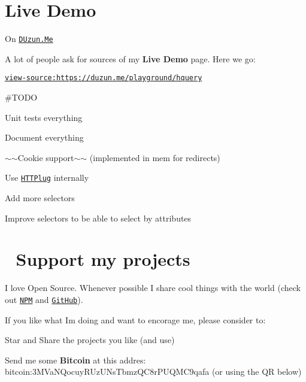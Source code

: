 \section*{Live Demo}

On \href{https://duzun.me/playground/hquery#sel=%20a%20%3E%20img%3Aparent&url=https%3A%2F%2Fgithub.com%2Fduzun}{\tt D\+Uzun.\+Me}

A lot of people ask for sources of my {\bfseries Live Demo} page. Here we go\+:

\href{https://github.com/duzun/hQuery.php/blob/master/examples/duzun.me_playground_hquery.php}{\tt view-\/source\+:https\+://duzun.\+me/playground/hquery}

\#\+T\+O\+DO


\begin{DoxyItemize}
\item Unit tests everything
\item Document everything
\item $\sim$$\sim$\+Cookie support$\sim$$\sim$ (implemented in mem for redirects)
\item Use \href{http://httplug.io/}{\tt H\+T\+T\+Plug} internally
\item Add more selectors
\item Improve selectors to be able to select by attributes
\end{DoxyItemize}

\section*{💖 Support my projects}

I love Open Source. Whenever possible I share cool things with the world (check out \href{https://duzun.me/npm}{\tt N\+PM} and \href{https://github.com/duzun/}{\tt Git\+Hub}).

If you like what I\textquotesingle{}m doing and want to encorage me, please consider to\+:


\begin{DoxyItemize}
\item Star and Share the projects you like (and use)
\item Send me some {\bfseries Bitcoin} at this addres\+: {\ttfamily bitcoin\+:3\+M\+Va\+N\+Qocuy\+R\+Uz\+U\+Ns\+Tbmz\+Q\+C8r\+P\+U\+Q\+M\+C9qafa} (or using the QR below)  
\end{DoxyItemize}